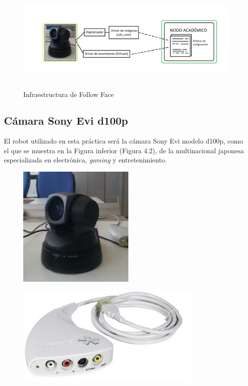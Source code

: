 \begin{figure}[H]
  \begin{center}
    \includegraphics[width=0.99\linewidth, height=5.5cm]{figures/disposicionff.png}
		\caption{Infraestructura de Follow Face}
		\label{fig.dispff}
		\end{center}
\end{figure}

\subsection{Cámara Sony Evi d100p}
El robot utilizado en esta práctica será la cámara Sony Evi modelo d100p, como el que se muestra en la Figura inferior (Figura 4.2), de la multinacional japonesa especializada en electrónica, \textit{gaming} y entretenimiento.

\begin{figure}[h]
	\centering
	\begin{minipage}[h]{.48\linewidth}
		\centering
		\includegraphics[width=.9\linewidth, height=6cm]{figures/sonyevi.png}
		\label{fig:sonyevi}
	\end{minipage}
	\begin{minipage}[h]{.48\linewidth}
		\centering
		\includegraphics[width=.9\linewidth, height=5cm]{figures/capturadora.jpg}
		\label{fig:digitalizadora}
	\end{minipage}
\end{figure}

